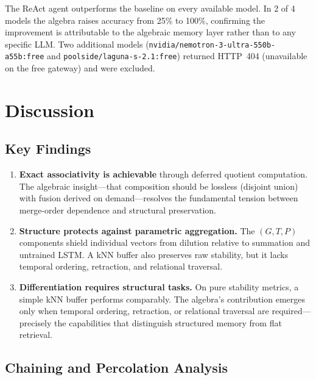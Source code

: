 \documentclass[11pt,a4paper]{article}
\theoremstyle{definition}
\begin{document}
The ReAct agent outperforms the baseline on every available model. In 2 of 4 models the algebra raises accuracy from 25\% to 100\%, confirming the improvement is attributable to the algebraic memory layer rather than to any specific LLM. Two additional models (\texttt{nvidia/nemotron-3-ultra-550b-a55b:free} and \texttt{poolside/laguna-s-2.1:free}) returned HTTP~404 (unavailable on the free gateway) and were excluded.

\section{Discussion}\label{sec:discussion}

\subsection{Key Findings}

\begin{enumerate}
    \item \textbf{Exact associativity is achievable} through deferred quotient computation. The algebraic insight---that composition should be lossless (disjoint union) with fusion derived on demand---resolves the fundamental tension between merge-order dependence and structural preservation.
    
    \item \textbf{Structure protects against parametric aggregation.} The $(G, T, P)$ components shield individual vectors from dilution relative to summation and untrained LSTM. A kNN buffer also preserves raw stability, but it lacks temporal ordering, retraction, and relational traversal.
    
    \item \textbf{Differentiation requires structural tasks.} On pure stability metrics, a simple kNN buffer performs comparably. The algebra's contribution emerges only when temporal ordering, retraction, or relational traversal are required---precisely the capabilities that distinguish structured memory from flat retrieval.
\end{enumerate}

\subsection{Chaining and Percolation Analysis}\label{sec:chaining}
\end{document}
